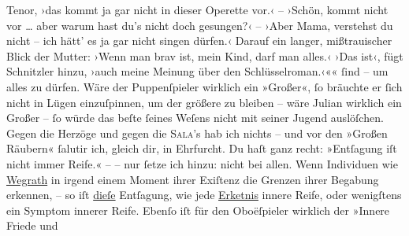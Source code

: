 {{{                     Tenor, ›das kommt ja gar nicht in dieser Operette vor.‹ – ›Schön, kommt nicht
                     vor {\dots} aber warum hast du’s nicht doch gesungen?‹ –
                     ›Aber Mama, verstehst du nicht – ich hätt’ es ja gar nicht singen dürfen.‹
                     Darauf ein langer, mißtrauischer Blick der Mutter: ›Wenn man brav ist, mein Kind, darf man
                     alles.‹ ›Das ist‹, fügt Schnitzler hinzu,
                     ›auch meine Meinung über den Schlüsselroman.‹«}}}\label{K_L01477-3}«{ }ſind – um alles
               zu dürfen. Wäre der Puppen{\pb}ſpieler
               wirklich ein »Großer«,{ }ſo bräuchte er{ }ſich nicht in Lügen einzuſpinnen, um der
               größere zu bleiben – wäre Julian wirklich ein Großer –{ }ſo würde das beſte{ }ſeines Weſens nicht mit
               seiner Jugend auslöſchen. Gegen die Herzöge und gegen die \textsc{Sala}’s hab ich nichts – und vor den »Großen Räubern«{ }ſalutir ich, gleich dir, in
               Ehrfurcht. Du haſt ganz recht: »Entſagung iſt nicht immer Reife.« – – nur{ }ſetze ich
               hinzu: nicht bei allen. Wenn Individuen wie \uline{Wegrath} in irgend einem Moment ihrer Exiſtenz die Grenzen ihrer Begabung erkennen, –
               {\pb}so iſt \uline{dieſe} Entſagung, wie jede \uline{Erke{\geminationn}tnis} innere Reife, oder wenigſtens ein
               Symptom innerer Reife. Ebenſo iſt für den Oboëſpieler wirklich der »Innere Friede und
